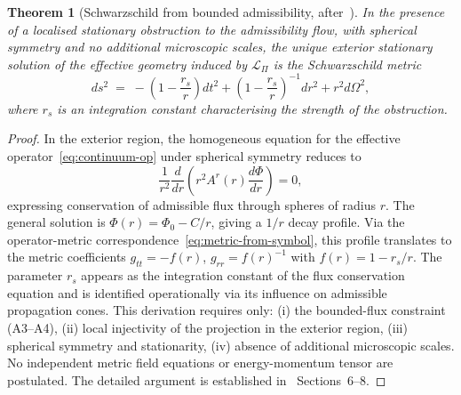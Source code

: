 \documentclass[11pt,a4paper]{article}
\newtheorem{theorem}{Theorem}[section]
\begin{document}
      \begin{theorem}[Schwarzschild from bounded admissibility,
        after~\cite{BornInfeld}]
        \label{thm:schwarzschild}
        In the presence of a localised stationary obstruction to the admissibility
        flow, with spherical symmetry and no additional microscopic scales, the
        unique exterior stationary solution of the effective geometry induced by
        $\mathcal{L}_\Pi$ is the Schwarzschild metric
        \begin{equation}
          \label{eq:schwarzschild}
          ds^2
          \;=\; -\!\left(1 - \frac{r_s}{r}\right)dt^2
          + \left(1 - \frac{r_s}{r}\right)^{-1}dr^2
          + r^2 d\Omega^2,
        \end{equation}
        where $r_s$ is an integration constant characterising the strength of the
        obstruction.
      \end{theorem}

      \begin{proof}
        In the exterior region, the homogeneous equation for the effective
        operator~\eqref{eq:continuum-op} under spherical symmetry reduces to
        \begin{equation}
          \frac{1}{r^2}\frac{d}{dr}\!\left(r^2 A^r(r)\frac{d\Phi}{dr}\right) = 0,
        \end{equation}
        expressing conservation of admissible flux through spheres of radius $r$.
        The general solution is $\Phi(r) = \Phi_0 - C/r$, giving a $1/r$ decay profile.
        Via the operator-metric correspondence~\eqref{eq:metric-from-symbol}, this
        profile translates to the metric coefficients $g_{tt} = -f(r)$,
        $g_{rr} = f(r)^{-1}$ with $f(r) = 1 - r_s/r$.
        The parameter $r_s$ appears as the integration constant of the flux
        conservation equation and is identified operationally via its influence on
        admissible propagation cones.
        This derivation requires only: (i) the bounded-flux constraint (A3--A4),
        (ii) local injectivity of the projection in the exterior region,
        (iii) spherical symmetry and stationarity, (iv) absence of additional
        microscopic scales.
        No independent metric field equations or energy-momentum tensor
        are postulated.
        The detailed argument is established in~\cite{BornInfeld} Sections~6--8.
      \end{proof}
\end{document}
